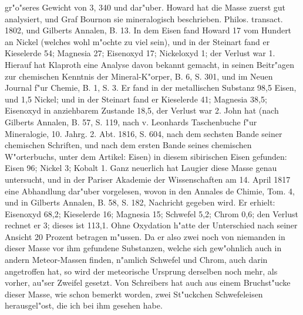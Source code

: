 \documentclass[a4paper, 11pt, oneside, polutonikogreek, german]{article}
\begin{document}
gr"o"seres Gewicht von 3, 340 und dar"uber. Howard hat die Masse zuerst gut analysiert, und Graf Bournon sie mineralogisch beschrieben. Philos. transact. 1802, und Gilberts Annalen, B. 13. In dem Eisen fand Howard 17 vom Hundert an Nickel (welches wohl m"ochte zu viel sein), und in der Steinart fand er Kieselerde 54; Magnesia 27; Eisenoxyd 17; Nickeloxyd 1; der Verlust war 1. Hierauf hat Klaproth eine Analyse davon bekannt gemacht, in seinen Beitr"agen zur chemischen Kenntnis der Mineral-K"orper, B. 6, S. 301, und im Neuen Journal f"ur Chemie, B. 1, S. 3. Er fand in der metallischen Substanz 98,5 Eisen, und 1,5 Nickel; und in der Steinart fand er Kieselerde 41; Magnesia 38,5; Eisenoxyd in anziehbarem Zustande 18,5, der Verlust war 2. John hat (nach Gilberts Annalen, B. 57, S. 119, nach v. Leonhards Taschenbuche f"ur Mineralogie, 10. Jahrg. 2. Abt. 1816, S. 604, nach dem sechsten Bande seiner chemischen Schriften, und nach dem ersten Bande seines chemischen W"orterbuchs, unter dem Artikel: Eisen) in diesem sibirischen Eisen gefunden: Eisen 96; Nickel 3; Kobalt 1. Ganz neuerlich hat Laugier diese Masse genau untersucht, und in der Pariser Akademie der Wissenschaften am 14. April 1817 eine Abhandlung dar"uber vorgelesen, wovon in den Annales de Chimie, Tom. 4, und in Gilberts Annalen, B. 58, S. 182, Nachricht gegeben wird. Er erhielt: Eisenoxyd 68,2; Kieselerde 16; Magnesia 15; Schwefel 5,2; Chrom 0,6; den Verlust rechnet er 3; dieses ist 113,1. Ohne Oxydation h"atte der Unterschied nach seiner Ansicht 20 Prozent betragen m"ussen. Da er also zwei noch von niemanden in dieser Masse vor ihm gefundene Substanzen, welche sich gew"ohnlich auch in andern Meteor-Massen finden, n"amlich Schwefel und Chrom, auch darin angetroffen hat, so wird der meteorische Ursprung derselben noch mehr, als vorher, au"ser Zweifel gesetzt. Von Schreibers hat auch aus einem Bruchst"ucke dieser Masse, wie schon bemerkt worden, zwei St"uckchen Schwefeleisen herausgel"ost, die ich bei ihm gesehen habe.
\end{document}
